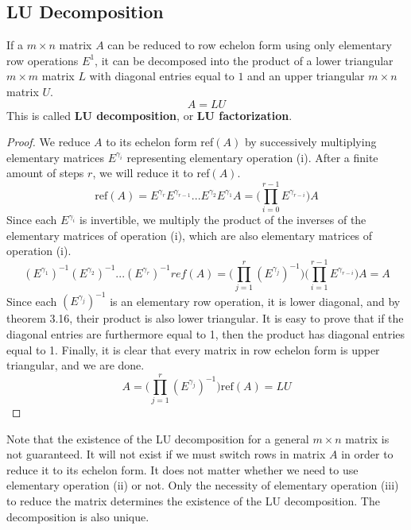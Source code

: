 \subsection{LU Decomposition}

  \begin{theorem}[LU Decompositions]
    If a $m \times n$ matrix $A$ can be reduced to row echelon form using only elementary row operations $E^1$, it can be decomposed into the product of a lower triangular $m \times m$ matrix $L$ with diagonal entries equal to $1$ and an upper triangular $m \times n$ matrix $U$. 
    \begin{equation}
      A = L U
    \end{equation}
    This is called \textbf{LU decomposition}, or \textbf{LU factorization}. 
  \end{theorem}
  \begin{proof}
    We reduce $A$ to its echelon form ref$(A)$ by successively multiplying elementary matrices $E^{\gamma_i}$ representing elementary operation (i). After a finite amount of steps $r$, we will reduce it to ref$(A)$.
    \begin{equation}
      \text{ref}(A) = E^{\gamma_r} E^{\gamma_{r-1}} ... E^{\gamma_2} E^{\gamma_1} A = \bigg(\prod_{i = 0}^{r-1} E^{\gamma_{r-i}}\bigg) A
    \end{equation}
    Since each $E^{\gamma_i}$ is invertible, we multiply the product of the inverses of the elementary matrices of operation (i), which are also elementary matrices of operation (i). 
    \begin{equation}
      (E^{\gamma_1})^{-1} (E^{\gamma_2})^{-1} ... (E^{\gamma_r})^{-1} ref(A) = \bigg( \prod_{j = 1}^r (E^{\gamma_j})^{-1} \bigg) \bigg( \prod_{i=1}^{r-1} E^{\gamma_{r-i}} \bigg) A = A
    \end{equation}
    Since each $(E^{\gamma_j})^{-1}$ is an elementary row operation, it is lower diagonal, and by theorem 3.16, their product is also lower triangular. It is easy to prove that if the diagonal entries are furthermore equal to 1, then the product has diagonal entries equal to 1. Finally, it is clear that every matrix in row echelon form is upper triangular, and we are done. 
    \begin{equation}
      A = \bigg( \prod_{j = 1}^r (E^{\gamma_j})^{-1} \bigg) \text{ref}(A) = L U
    \end{equation}
  \end{proof}

  Note that the existence of the LU decomposition for a general $m \times n$ matrix is not guaranteed. It will not exist if we must switch rows in matrix $A$ in order to reduce it to its echelon form. It does not matter whether we need to use elementary operation (ii) or not. Only the necessity of elementary operation (iii) to reduce the matrix determines the existence of the LU decomposition. The decomposition is also unique. 

